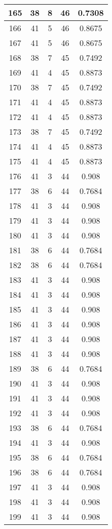 \documentclass[letterpaper, 12pt]{article}
\begin{document}
\begin{longtable}{|c|c|c|c|c|}
\hline
165 & 38 & 8 & 46 & 0.7308 \\
\hline
166 & 41 & 5 & 46 & 0.8675 \\
\hline
167 & 41 & 5 & 46 & 0.8675 \\
\hline
168 & 38 & 7 & 45 & 0.7492 \\
\hline
169 & 41 & 4 & 45 & 0.8873 \\
\hline
170 & 38 & 7 & 45 & 0.7492 \\
\hline
171 & 41 & 4 & 45 & 0.8873 \\
\hline
172 & 41 & 4 & 45 & 0.8873 \\
\hline
173 & 38 & 7 & 45 & 0.7492 \\
\hline
174 & 41 & 4 & 45 & 0.8873 \\
\hline
175 & 41 & 4 & 45 & 0.8873 \\
\hline
176 & 41 & 3 & 44 & 0.908 \\
\hline
177 & 38 & 6 & 44 & 0.7684 \\
\hline
178 & 41 & 3 & 44 & 0.908 \\
\hline
179 & 41 & 3 & 44 & 0.908 \\
\hline
180 & 41 & 3 & 44 & 0.908 \\
\hline
181 & 38 & 6 & 44 & 0.7684 \\
\hline
182 & 38 & 6 & 44 & 0.7684 \\
\hline
183 & 41 & 3 & 44 & 0.908 \\
\hline
184 & 41 & 3 & 44 & 0.908 \\
\hline
185 & 41 & 3 & 44 & 0.908 \\
\hline
186 & 41 & 3 & 44 & 0.908 \\
\hline
187 & 41 & 3 & 44 & 0.908 \\
\hline
188 & 41 & 3 & 44 & 0.908 \\
\hline
189 & 38 & 6 & 44 & 0.7684 \\
\hline
190 & 41 & 3 & 44 & 0.908 \\
\hline
191 & 41 & 3 & 44 & 0.908 \\
\hline
192 & 41 & 3 & 44 & 0.908 \\
\hline
193 & 38 & 6 & 44 & 0.7684 \\
\hline
194 & 41 & 3 & 44 & 0.908 \\
\hline
195 & 38 & 6 & 44 & 0.7684 \\
\hline
196 & 38 & 6 & 44 & 0.7684 \\
\hline
197 & 41 & 3 & 44 & 0.908 \\
\hline
198 & 41 & 3 & 44 & 0.908 \\
\hline
199 & 41 & 3 & 44 & 0.908 \\
\hline
\end{longtable}
\end{document}
